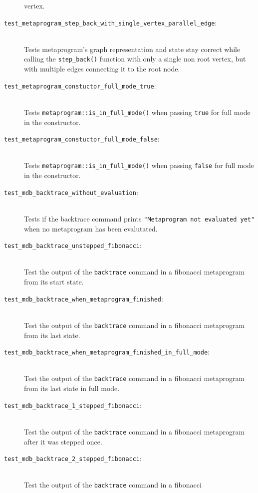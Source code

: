 \begin{description}
        vertex.
    \item[\texttt{test\_metaprogram\_step\_back\_with\_single\_vertex\_parallel\_edge}:] \hfill \\
        Tests metaprogram's graph representation and state stay correct while
        calling the \texttt{step\_back()} function with only a single non root
        vertex, but with multiple edges connecting it to the root node.
    \item[\texttt{test\_metaprogram\_constuctor\_full\_mode\_true}:] \hfill \\
        Tests \texttt{metaprogram::is\_in\_full\_mode()} when passing
        \texttt{true} for full mode in the constructor.
    \item[\texttt{test\_metaprogram\_constuctor\_full\_mode\_false}:] \hfill \\
        Tests \texttt{metaprogram::is\_in\_full\_mode()} when passing
        \texttt{false} for full mode in the constructor.
    \item[\texttt{test\_mdb\_backtrace\_without\_evaluation}:] \hfill \\
        Tests if the backtrace command prints
        \texttt{"Metaprogram not evaluated yet"} when no metaprogram has been
        evalutated.
    \item[\texttt{test\_mdb\_backtrace\_unstepped\_fibonacci}:] \hfill \\
        Test the output of the \texttt{backtrace} command in a fibonacci
        metaprogram from its start state.
    \item[\texttt{test\_mdb\_backtrace\_when\_metaprogram\_finished}:] \hfill \\
        Test the output of the \texttt{backtrace} command in a fibonacci
        metaprogram from its last state.
    \item[\texttt{test\_mdb\_backtrace\_when\_metaprogram\_finished\_in\_full\_mode}:] \hfill \\
        Test the output of the \texttt{backtrace} command in a fibonacci
        metaprogram from its last state in full mode.
    \item[\texttt{test\_mdb\_backtrace\_1\_stepped\_fibonacci}:] \hfill \\
        Test the output of the \texttt{backtrace} command in a fibonacci
        metaprogram after it was stepped once.
    \item[\texttt{test\_mdb\_backtrace\_2\_stepped\_fibonacci}:] \hfill \\
        Test the output of the \texttt{backtrace} command in a fibonacci

\end{description}
